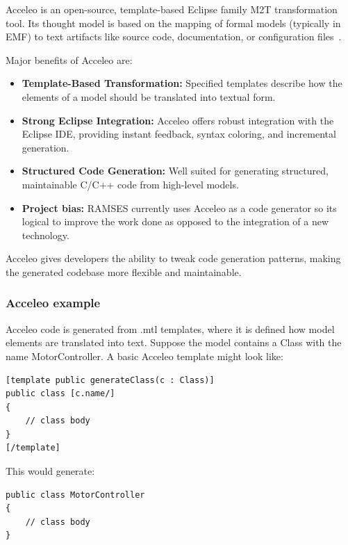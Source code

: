 Acceleo is an open-source, template-based Eclipse family \gls{M2T} transformation tool. Its thought model is based on the mapping of formal models (typically in \gls{EMF}) to text artifacts like source code, documentation, or configuration files~\cite{AcceleoUserGuide}.

Major benefits of Acceleo are: 
\begin{itemize} 
	\item \textbf{Template-Based Transformation:} Specified templates describe how the elements of a model should be translated into textual form.
	\item \textbf{Strong Eclipse Integration:} Acceleo offers robust integration with the Eclipse IDE, providing instant feedback, syntax coloring, and incremental generation.
	\item \textbf{Structured Code Generation:} Well suited for generating structured, maintainable C/C++ code from high-level models.
	\item \textbf{Project bias:} \gls{RAMSES} currently uses Acceleo as a code generator so its logical to improve the work done as opposed to the integration of a new technology.
\end{itemize}

\begin{tcolorbox}[colback=blue!5, colframe=blue!40!black] Acceleo gives developers the ability to tweak code generation patterns, making the generated codebase more flexible and maintainable. \end{tcolorbox}

\subsubsection*{Acceleo example}

Acceleo code is generated from .mtl templates, where it is defined how model elements are translated into text.
Suppose the model contains a Class with the name MotorController. A basic Acceleo template might look like:

\begin{verbatim}
[template public generateClass(c : Class)]
public class [c.name/]
{
	// class body
}
[/template]
\end{verbatim}

This would generate:

\begin{verbatim}
public class MotorController
{
	// class body
}
\end{verbatim}

